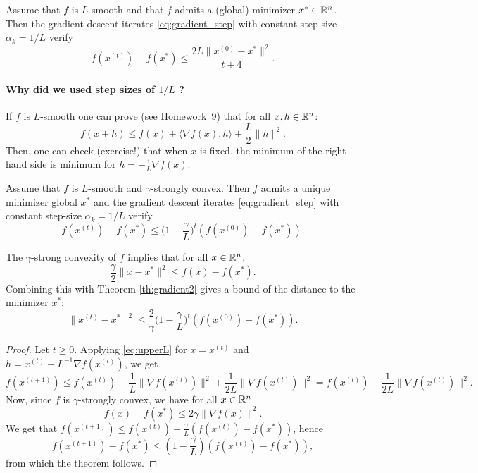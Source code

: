 \documentclass[11pt,nocut]{article}
\begin{document}
\begin{theorem}
	Assume that $f$ is $L$-smooth and that $f$ admits a (global) minimizer $x^* \in \mathbb{R}^n$. Then
	the gradient descent iterates \eqref{eq:gradient_step} with constant step-size $\alpha_k = 1/L$ verify
	$$
	f(x^{(t)}) - f(x^*) \leq \frac{2 L \| x^{(0)} - x^* \|^2}{t+4}.
	$$
\end{theorem}

\paragraph{Why did we used step sizes of $1/L$ ?} If $f$ is $L$-smooth one can prove (see Homework~9) that for all $x,h \in \mathbb{R}^n$:
\begin{equation}\label{eq:upperL}
f(x+h) \leq f(x) + \langle \nabla f(x) , h \rangle + \frac{L}{2} \|h\|^2.
\end{equation}
Then, one can check (exercise!) that when $x$ is fixed, the minimum of the right-hand side is minimum for $h = - \frac{1}{L} \nabla f(x)$.

\begin{theorem}\label{th:gradient2}
	Assume that $f$ is $L$-smooth and $\gamma$-strongly convex. 
	Then $f$ admits a unique minimizer global $x^*$ and
	the gradient descent iterates \eqref{eq:gradient_step} with constant step-size $\alpha_k = 1/L$ verify
	$$
	f(x^{(t)}) - f(x^*) \leq \Big(1-\frac{\gamma}{L}\Big)^t (f(x^{(0)}) - f(x^*)).
	$$
\end{theorem}
\begin{remark}
	The $\gamma$-strong convexity of $f$ implies that for all $x \in \mathbb{R}^n$,
	$$
	\frac{\gamma}{2} \|x - x^* \|^2 \leq f(x)-f(x^*).
	$$
	Combining this with Theorem \ref{th:gradient2} gives a bound of the distance to the minimizer $x^*$:
	$$
	\|x^{(t)} - x^* \|^2 \leq \frac{2}{\gamma}\Big(1-\frac{\gamma}{L}\Big)^t (f(x^{(0)}) - f(x^*)).
	$$
\end{remark}

\begin{proof}
	Let $t \geq 0$. Applying \eqref{eq:upperL} for $x=x^{(t)}$ and $h=x^{(t)} - L^{-1} \nabla f(x^{(t)})$, we get
	$$
	f(x^{(t+1)}) 
	\leq f(x^{(t)}) - \frac{1}{L} \|\nabla f(x^{(t)}) \|^2 + \frac{1}{2L}\|\nabla f(x^{(t)}) \|^2
	= f(x^{(t)}) - \frac{1}{2L} \|\nabla f(x^{(t)}) \|^2.
	$$
Now, since $f$ is $\gamma$-strongly convex, we have for all $x \in \mathbb{R}^n$
$$
f(x) - f(x^*) \leq 2 \gamma \|\nabla f(x)\|^2.
$$
We get that $f(x^{(t+1)}) \leq f(x^{(t)}) - \frac{\gamma}{L}(f(x^{(t)}) - f(x^*))$, hence
$$
f(x^{(t+1)}) - f(x^*) \leq (1 - \frac{\gamma}{L})(f(x^{(t)}) - f(x^*)),
$$
from which the theorem follows.
\end{proof}
\end{document}
